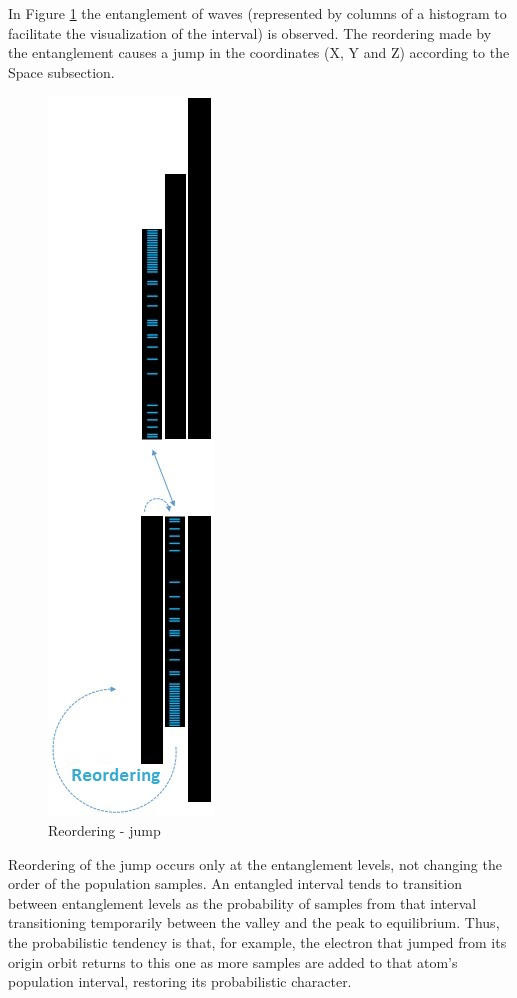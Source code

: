In Figure \ref{fig:consciousness_space_subconscious_observation_jump} the entanglement of waves (represented by columns of a histogram to facilitate the visualization of the interval) is observed. The reordering made by the entanglement causes a jump in the coordinates (X, Y and Z) according to the Space subsection.
	\begin{figure}[H]
	\caption{Reordering - jump}
	\label{fig:consciousness_space_subconscious_observation_jump}
	\centering
	\includegraphics[scale=.53]{sections/images/consciousness_space_subconscious_observation_jump.jpg}
	\end{figure}

Reordering of the jump occurs only at the entanglement levels, not changing the order of the population samples. An entangled interval tends to transition between entanglement levels as the probability of samples from that interval transitioning temporarily between the valley and the peak to equilibrium. Thus, the probabilistic tendency is that, for example, the electron that jumped from its origin orbit returns to this one as more samples are added to that atom's population interval, restoring its probabilistic character.


